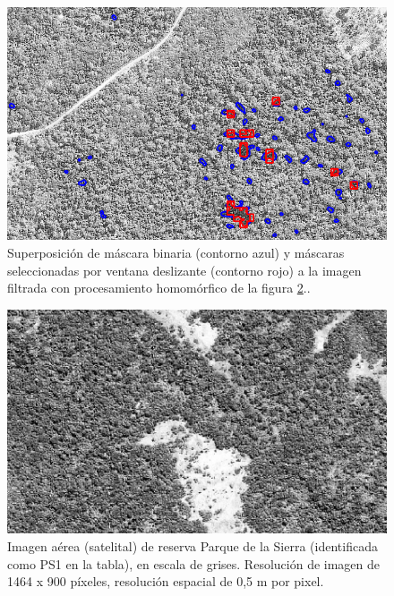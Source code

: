 \begin{figure}[h!]
    \includegraphics[width=\textwidth]{Imagenes/Homomorfico/ST2_25.png}
     \hfill
     \caption{Superposición de máscara binaria (contorno azul) y máscaras seleccionadas por ventana deslizante (contorno rojo) a la imagen filtrada con procesamiento homomórfico de la figura \ref{PS1}..}
    \label{ST25}
\end{figure}
\begin{figure}[h!]
    \includegraphics[width=\textwidth]{Imagenes/Homomorfico/PS1_original.jpg}
     \hfill
     \caption{Imagen aérea (satelital) de reserva Parque de la Sierra (identificada como PS1 en la tabla), en escala de grises. Resolución de imagen de 1464 x 900 píxeles, resolución espacial de 0,5 m por pixel.}
    \label{PS1}
\end{figure}

